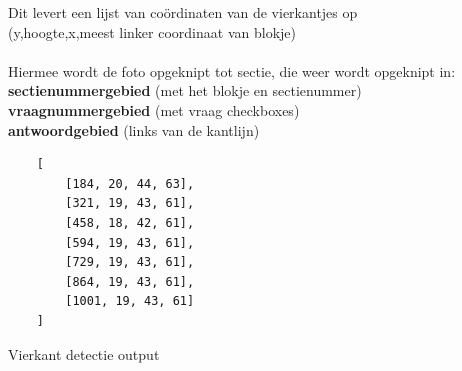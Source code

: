 \documentclass[12pt]{article}
\begin{document}
\begin{multicols}{2}
   Dit levert een lijst van coördinaten van de vierkantjes op\\(y,hoogte,x,meest linker coordinaat van blokje)\\
   \\
   Hiermee wordt de foto opgeknipt tot sectie, die weer wordt opgeknipt in:\\
   \textbf{sectienummergebied} (met het blokje en sectienummer) \\
   \textbf{vraagnummergebied} (met vraag checkboxes) \\
   \textbf{antwoordgebied} (links van de kantlijn)
   
    \begin{listing}[H]
    \begin{verbatim}
    [
        [184, 20, 44, 63], 
        [321, 19, 43, 61], 
        [458, 18, 42, 61], 
        [594, 19, 43, 61], 
        [729, 19, 43, 61], 
        [864, 19, 43, 61], 
        [1001, 19, 43, 61]
    ]
    \end{verbatim}
    \caption{Vierkant detectie output}\label{json-example}
    \end{listing}

\end{multicols}

\pagebreak
\end{document}
